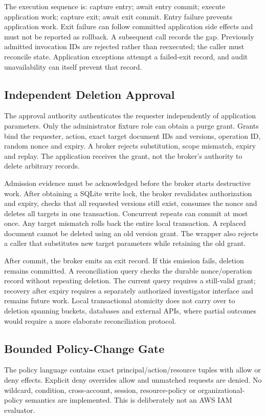 \documentclass[11pt,a4paper]{article}
\begin{document}
The execution sequence is: capture entry; await entry commit; execute application work; capture exit; await exit commit. Entry failure prevents application work. Exit failure can follow committed application side effects and must not be reported as rollback. A subsequent call records the gap. Previously admitted invocation IDs are rejected rather than reexecuted; the caller must reconcile state. Application exceptions attempt a failed-exit record, and audit unavailability can itself prevent that record.

\subsection{Independent Deletion Approval}\label{sec:purge}
The approval authority authenticates the requester independently of application parameters. Only the administrator fixture role can obtain a purge grant. Grants bind the requester, action, exact target document IDs and versions, operation ID, random nonce and expiry. A broker rejects substitution, scope mismatch, expiry and replay. The application receives the grant, not the broker's authority to delete arbitrary records.

Admission evidence must be acknowledged before the broker starts destructive work. After obtaining a SQLite write lock, the broker revalidates authorization and expiry, checks that all requested versions still exist, consumes the nonce and deletes all targets in one transaction. Concurrent repeats can commit at most once. Any target mismatch rolls back the entire local transaction. A replaced document cannot be deleted using an old version grant. The wrapper also rejects a caller that substitutes new target parameters while retaining the old grant.

After commit, the broker emits an exit record. If this emission fails, deletion remains committed. A reconciliation query checks the durable nonce/operation record without repeating deletion. The current query requires a still-valid grant; recovery after expiry requires a separately authorized investigator interface and remains future work. Local transactional atomicity does not carry over to deletion spanning buckets, databases and external APIs, where partial outcomes would require a more elaborate reconciliation protocol.

\subsection{Bounded Policy-Change Gate}\label{sec:policy}
The policy language contains exact principal/action/resource tuples with allow or deny effects. Explicit deny overrides allow and unmatched requests are denied. No wildcard, condition, cross-account, session, resource-policy or organizational-policy semantics are implemented. This is deliberately not an AWS IAM evaluator.
\end{document}
